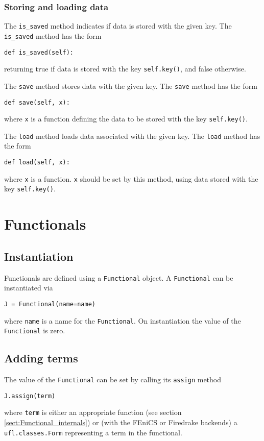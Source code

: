 \documentclass[11pt]{article}
\begin{document}
\subsubsection{Storing and loading data}

The \texttt{is\_saved} method indicates if data is stored with the given key.
The \texttt{is\_saved} method has the form
\begin{lstlisting}
def is_saved(self):
\end{lstlisting}
returning true if data is stored with the key \texttt{self.key()}, and false
otherwise.

The \texttt{save} method stores data with the given key. The \texttt{save}
method has the form
\begin{lstlisting}
def save(self, x):
\end{lstlisting}
where \texttt{x} is a function defining the data to be stored with the
key \texttt{self.key()}.

The \texttt{load} method loads data associated with the given key. The
\texttt{load} method has the form
\begin{lstlisting}
def load(self, x):
\end{lstlisting}
where \texttt{x} is a function. \texttt{x} should be set by this method, using
data stored with the key \texttt{self.key()}.

\section{Functionals}\label{sect:Functional} 

\subsection{Instantiation}

Functionals are defined using a \texttt{Functional} object. A
\texttt{Functional} can be instantiated via
\begin{lstlisting}
J = Functional(name=name)
\end{lstlisting}
where \texttt{name} is a name for the \texttt{Functional}. On instantiation the
value of the \texttt{Functional} is zero.

\subsection{Adding terms}

The value of the \texttt{Functional} can be set by calling its \texttt{assign}
method
\begin{lstlisting}
J.assign(term)
\end{lstlisting}
where \texttt{term} is either an appropriate function (see section
\ref{sect:Functional_internals}) or (with the FEniCS or Firedrake backends) a
\texttt{ufl.classes.Form} representing a term in the functional.
\end{document}
